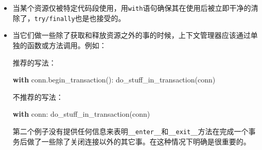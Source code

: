 \documentclass[ignorenonframetext,9pt]{beamer}
\newenvironment{Shaded}{}{}
\newcommand{\ControlFlowTok}[1]{\textcolor[rgb]{0.00,0.44,0.13}{\textbf{#1}}}
\newcommand{\NormalTok}[1]{#1}
\begin{document}
\begin{frame}[fragile]

\begin{itemize}
\item
  当某个资源仅被特定代码段使用，用\texttt{with}语句确保其在使用后被立即干净的清除了，\texttt{try/finally}也是也接受的。
\item
  当它们做一些除了获取和释放资源之外的事的时候，上下文管理器应该通过单独的函数或方法调用。例如：

  推荐的写法：

\begin{Shaded}
\begin{Highlighting}[]
\ControlFlowTok{with}\NormalTok{ conn.begin_transaction():}
\NormalTok{    do_stuff_in_transaction(conn)}
\end{Highlighting}
\end{Shaded}

  不推荐的写法：

\begin{Shaded}
\begin{Highlighting}[]
\ControlFlowTok{with}\NormalTok{ conn:}
\NormalTok{    do_stuff_in_transaction(conn)}
\end{Highlighting}
\end{Shaded}

  第二个例子没有提供任何信息来表明\texttt{\_\_enter\_\_}和\texttt{\_\_exit\_\_}方法在完成一个事务后做了一些除了关闭连接以外的其它事。在这种情况下明确是很重要的。
\end{itemize}

\end{frame}
\end{document}
